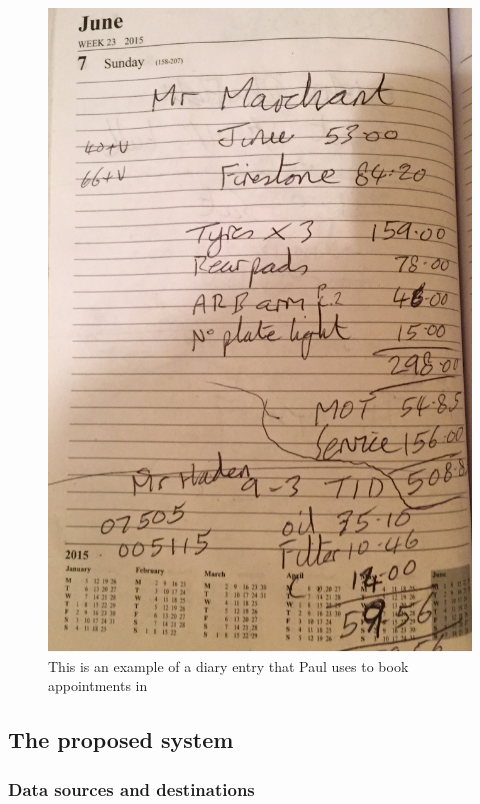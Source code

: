\documentclass{article}
\begin{document}
	
	\begin{figure}[H]   
    
    
    
    
    \includegraphics[width=\textwidth]{image_5.jpeg}
    \caption{This is an example of a diary entry that Paul uses to book appointments in}
    
    
	\end{figure}
	

	
		
	
	\subsection{The proposed system}
	

	\subsubsection{Data sources and destinations}
\end{document}
